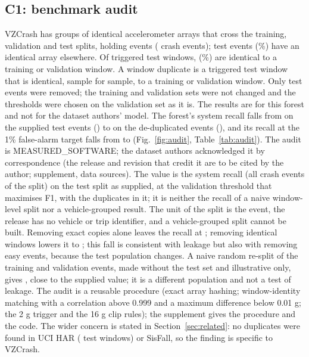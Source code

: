 \documentclass{ieeeaccess}
\begin{document}
\subsection{C1: benchmark audit}
\label{sec:c1}
VZCrash has \VzGroups{} groups of identical accelerometer arrays that cross the training, validation and test splits, holding \VzGroupEvents{} events (\VzCrashEvents{} crash events); \VzTestExact{} test events (\VzTestExactShare\%) have an identical array elsewhere. Of \VzNearScanned{} triggered test windows, \VzNearBoth{} (\VzNearShare\%) are identical to a training or validation window. A window duplicate is a triggered test window that is identical, sample for sample, to a training or validation window. Only test events were removed; the training and validation sets were not changed and the thresholds were chosen on the validation set as it is. The results are for this forest and not for the dataset authors' model. The forest's system recall falls from \VzRecSup{} on the supplied test events (\VzEvSup{}) to \VzRecNear{} on the de-duplicated events (\VzEvNear{}), and its recall at the 1\% false-alarm target falls from \VzROneSup{} to \VzROneNear{} (Fig.~\ref{fig:audit}, Table~\ref{tab:audit}). The audit is MEASURED\_SOFTWARE; the dataset authors acknowledged it by correspondence (the release and revision that credit it are to be cited by the author; supplement, data sources). The value \VzRecSup{} is the system recall (all crash events of the split) on the test split as supplied, at the validation threshold that maximises F1, with the duplicates in it; it is neither the recall of a naive window-level split nor a vehicle-grouped result. The unit of the split is the event, the release has no vehicle or trip identifier, and a vehicle-grouped split cannot be built. Removing exact copies alone leaves the recall at \VzRecExact{}; removing identical windows lowers it to \VzRecNear{}; this fall is consistent with leakage but also with removing easy events, because the test population changes. A naive random re-split of the training and validation events, made without the test set and illustrative only, gives \VzRecNaive{}, close to the supplied value; it is a different population and not a test of leakage. The audit is a reusable procedure (exact array hashing; window-identity matching with a correlation above 0.999 and a maximum difference below 0.01 g; the 2 g trigger and the 16 g clip rules); the supplement gives the procedure and the code. The wider concern is stated in Section~\ref{sec:related}: no duplicates were found in UCI HAR (\RFiveHar{} test windows) or SisFall, so the finding is specific to VZCrash.
\end{document}
